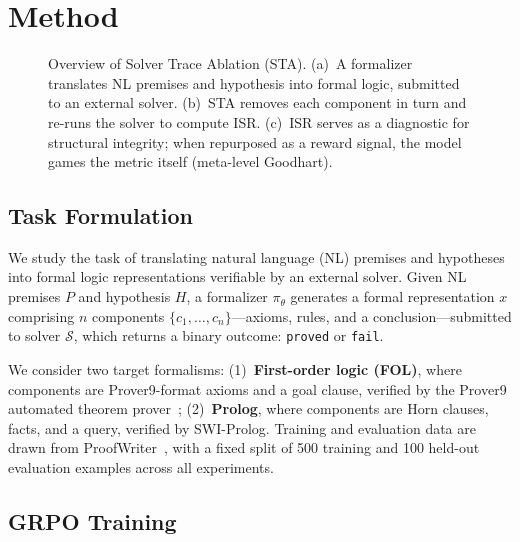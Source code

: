 \section{Method}
\label{sec:method}

\begin{figure}[t]
\centering
\caption{Overview of Solver Trace Ablation (STA). (a)~A formalizer translates NL premises and hypothesis into formal logic, submitted to an external solver. (b)~STA removes each component in turn and re-runs the solver to compute ISR. (c)~ISR serves as a diagnostic for structural integrity; when repurposed as a reward signal, the model games the metric itself (meta-level Goodhart).}
\label{fig:sta-overview}
\end{figure}

\subsection{Task Formulation}
\label{sec:task}

We study the task of translating natural language (NL) premises and hypotheses into formal logic representations verifiable by an external solver.
Given NL premises $P$ and hypothesis $H$, a formalizer $\pi_\theta$ generates a formal representation $x$ comprising $n$ components $\{c_1, \ldots, c_n\}$---axioms, rules, and a conclusion---submitted to solver $\mathcal{S}$, which returns a binary outcome: \texttt{proved} or \texttt{fail}.

We consider two target formalisms:
(1)~\textbf{First-order logic (FOL)}, where components are Prover9-format axioms and a goal clause, verified by the Prover9 automated theorem prover~\cite{mccune2010prover9};
(2)~\textbf{Prolog}, where components are Horn clauses, facts, and a query, verified by SWI-Prolog.
Training and evaluation data are drawn from ProofWriter~\cite{proofwriter}, with a fixed split of 500 training and 100 held-out evaluation examples across all experiments.

\subsection{GRPO Training}
\label{sec:grpo}

